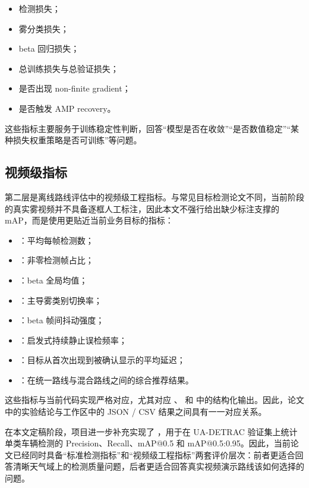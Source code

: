 \begin{itemize}[leftmargin=2em]
\item 检测损失；
\item 雾分类损失；
\item beta 回归损失；
\item 总训练损失与总验证损失；
\item 是否出现 non-finite gradient；
\item 是否触发 AMP recovery。
\end{itemize}

这些指标主要服务于训练稳定性判断，回答“模型是否在收敛”“是否数值稳定”“某种损失权重策略是否可训练”等问题。

\subsection{视频级指标}

第二层是离线路线评估中的视频级工程指标。与常见目标检测论文不同，当前阶段的真实雾视频并不具备逐框人工标注，因此本文不强行给出缺少标注支撑的 mAP，而是使用更贴近当前业务目标的指标：

\begin{itemize}[leftmargin=2em]
\item {}：平均每帧检测数；
\item {}：非零检测帧占比；
\item {}：beta 全局均值；
\item {}：主导雾类别切换率；
\item {}：beta 帧间抖动强度；
\item {}：启发式持续静止误检频率；
\item {}：目标从首次出现到被确认显示的平均延迟；
\item {}：在统一路线与混合路线之间的综合推荐结果。
\end{itemize}

这些指标与当前代码实现严格对应，尤其对应 、 和  中的结构化输出。因此，论文中的实验结论与工作区中的 JSON / CSV 结果之间具有一一对应关系。

在本文定稿阶段，项目进一步补充实现了 ，用于在 UA-DETRAC 验证集上统计单类车辆检测的 Precision、Recall、mAP@0.5 和 mAP@0.5:0.95\cite{uadetrac}。因此，当前论文已经同时具备“标准检测指标”和“视频级工程指标”两套评价层次：前者更适合回答清晰天气域上的检测质量问题，后者更适合回答真实视频演示路线该如何选择的问题。

